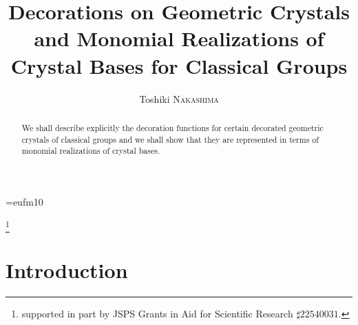 

\textwidth=15.5cm
\oddsidemargin=0pt
\evensidemargin=0pt


\usepackage{graphicx,amsthm,enumerate}
\usepackage{verbatim,amsmath,amscd,amssymb,color}
\usepackage[mathscr]{eucal}


\font\germ=eufm10

\def\bfii0{{\bf i_0}}

\def\W1{W(\varpi_1)}

\newtheorem{pro}{Proposition}[section]
\newtheorem{thm}[pro]{Theorem}
\newtheorem{lem}[pro]{Lemma}
\newtheorem{ex}[pro]{Example}
\newtheorem{cor}[pro]{Corollary}
\newtheorem{conj}[pro]{Conjecture}
\theoremstyle{definition}
\newtheorem{df}[pro]{Definition}

\title[Decorations on Geometric Crystals and 
Monomial Realizations of Crystal Bases ]
{Decorations on Geometric Crystals and 
Monomial Realizations of Crystal Bases for Classical Groups}

\author{Toshiki N\textsc{akashima}}
\address{Department of Mathematics, 
Sophia University, Kioicho 7-1, Chiyoda-ku, Tokyo 102-8554,
Japan}
\thanks{supported in part by JSPS Grants 
in Aid for Scientific Research $\sharp 22540031$.}

\date{}


\begin{abstract}
We shall describe explicitly 
the decoration functions for certain 
decorated geometric crystals of classical groups
and we shall show that they are
represented in terms of monomial realizations of crystal bases.
\end{abstract}

\maketitle

\tableofcontents

\section{Introduction}
\setcounter{equation}{0}


